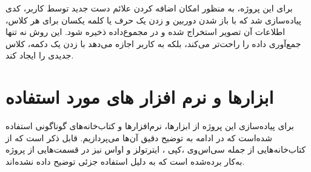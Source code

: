 برای این پروژه، به منظور امکان اضافه کردن علائم دست جدید توسط کاربر، کدی پیاده‌سازی شد که با باز شدن دوربین و زدن یک حرف 
یا کلمه یکسان برای هر کلاس، اطلاعات آن تصویر استخراج شده و در مجموع‌داده ذخیره شود. این روش نه تنها جمع‌آوری داده را راحت‌تر می‌کند، بلکه به کاربر اجازه می‌دهد با زدن یک دکمه، کلاس جدیدی را ایجاد کند.



\section{ابزار‌ها و نرم افزار های مورد استفاده}
برای پیاده‌سازی این پروژه از ابزار‌ها، نرم‌افزار‌ها و کتاب‌خانه‌های گوناگونی استفاده شده‌است که در ادامه به توضیح دقیق آن‌ها می‌پردازیم. قابل ذکر است که از کتاب‌خانه‌هایی از جمله سی‌اس‌وی ،کپی ، ایترتولز و اواس نیز در قسمت‌هایی از پروژه به‌کار برده‌شده است که به دلیل استفاده جزئی توضیح داده نشده‌اند.

